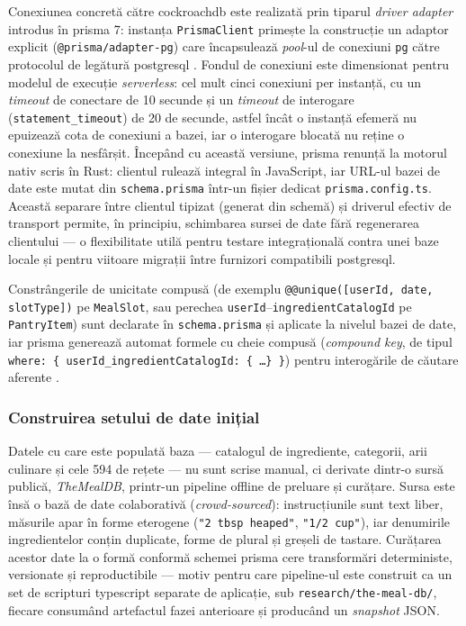 Conexiunea concretă către \gls{cockroachdb} este realizată prin tiparul \textit{driver adapter} introdus în \gls{prisma} 7: instanța \texttt{PrismaClient} primește la construcție un adaptor explicit (\texttt{@prisma/adapter-pg}) care încapsulează \textit{pool}-ul de conexiuni \texttt{pg} către protocolul de legătură \gls{postgresql} \cite{prisma_orm,cockroachdb}. Fondul de conexiuni este dimensionat pentru modelul de execuție \textit{serverless}: cel mult cinci conexiuni per instanță, cu un \textit{timeout} de conectare de 10 secunde și un \textit{timeout} de interogare (\texttt{statement\_timeout}) de 20 de secunde, astfel încât o instanță efemeră nu epuizează cota de conexiuni a bazei, iar o interogare blocată nu reține o conexiune la nesfârșit. Începând cu această versiune, \gls{prisma} renunță la motorul nativ scris în Rust: clientul rulează integral în JavaScript, iar URL-ul bazei de date este mutat din \texttt{schema.prisma} într-un fișier dedicat \texttt{prisma.config.ts}. Această separare între clientul tipizat (generat din schemă) și driverul efectiv de transport permite, în principiu, schimbarea sursei de date fără regenerarea clientului --- o flexibilitate utilă pentru testare integrațională contra unei baze locale și pentru viitoare migrații între furnizori compatibili \gls{postgresql}.

Constrângerile de unicitate compusă (de exemplu \texttt{@@unique([userId, date, slotType])} pe \texttt{MealSlot}, sau perechea \texttt{userId}--\texttt{ingredientCatalogId} pe \texttt{PantryItem}) sunt declarate în \texttt{schema.prisma} și aplicate la nivelul bazei de date, iar \gls{prisma} generează automat formele cu cheie compusă (\textit{compound key}, de tipul \texttt{where: \{ userId\_ingredientCatalogId: \{ \ldots \} \}}) pentru interogările de căutare aferente \cite{prisma_orm}.

\subsubsection{Construirea setului de date inițial}\label{subsec:pipeline-date}

Datele cu care este populată baza --- catalogul de ingrediente, categorii, arii culinare și cele 594 de rețete --- nu sunt scrise manual, ci derivate dintr-o sursă publică, \textit{TheMealDB}, printr-un pipeline offline de preluare și curățare. Sursa este însă o bază de date colaborativă (\textit{crowd-sourced}): instrucțiunile sunt text liber, măsurile apar în forme eterogene (\texttt{"2 tbsp heaped"}, \texttt{"1/2 cup"}), iar denumirile ingredientelor conțin duplicate, forme de plural și greșeli de tastare. Curățarea acestor date la o formă conformă schemei \gls{prisma} cere transformări deterministe, versionate și reproductibile --- motiv pentru care pipeline-ul este construit ca un set de scripturi \gls{typescript} separate de aplicație, sub \texttt{research/the-meal-db/}, fiecare consumând artefactul fazei anterioare și producând un \textit{snapshot} JSON.

